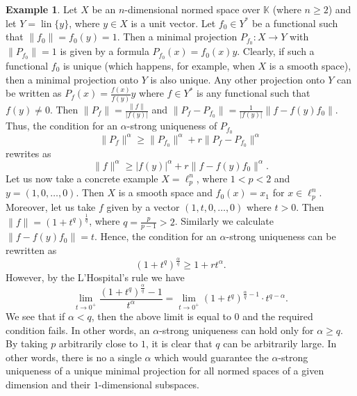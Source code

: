 \documentclass[12pt, reqno]{amsart}
\theoremstyle{definition}
\newtheorem{example}[twr]{Example}
\theoremstyle{remark}
\numberwithin{equation}{section}
\DeclareMathOperator{\lin}{lin}
\begin{document}
\begin{example}
\label{example1dim}
Let $X$ be an $n$-dimensional normed space over $\mathbb{K}$ (where $n \geq 2$) and let $Y = \lin\{y\}$, where $y \in X$ is a unit vector. Let $f_0 \in Y^*$ be a functional such that $\|f_0\|=f_0(y)=1$. Then a minimal projection $P_{f_0}: X \to Y$ with $\|P_{f_0}\|=1$ is given by a formula $P_{f_0}(x)= f_0(x)y$. Clearly, if such a functional $f_0$ is unique (which happens, for example, when $X$ is a smooth space), then a minimal projection onto $Y$ is also unique. Any other projection onto $Y$ can be written as $P_{f}(x)=\frac{f(x)}{f(y)} y$ where $f \in Y^*$ is any functional such that $f(y) \neq 0$. Then $\|P_f\| = \frac{\|f\|}{|f(y)|}$ and $\|P_f - P_{f_0}\| = \frac{1}{|f(y)|}\|f - f(y)f_0\|$. Thus, the condition for an $\alpha$-strong uniqueness of $P_{f_0}$
$$\|P_{f}\|^{\alpha} \geq \|P_{f_0}\|^{\alpha} + r \|P_f - P_{f_0}\|^{\alpha}$$
rewrites as
$$\|f\|^{\alpha} \geq |f(y)|^{\alpha} + r\|f - f(y)f_0\|^{\alpha}.$$
Let us now take a concrete example $X = \ell_p^n$, where $1 < p < 2$ and $y=(1, 0, \ldots, 0)$. Then $X$ is a smooth space and $f_0(x)=x_1$ for $x \in \ell_p^n$. Moreover, let us take $f$ given by a vector $(1, t, 0, \ldots, 0)$ where $t>0$. Then $\|f\|=\left ( 1 + t^q \right )^{\frac{1}{q}}$, where $q = \frac{p}{p-1}>2$. Similarly we calculate $\|f-f(y)f_0\| = t$. Hence, the condition for an $\alpha$-strong uniqueness can be rewritten as
$$\left ( 1 + t^q \right )^{\frac{\alpha}{q}} \geq 1 + rt^{\alpha}.$$
However, by the L'Hospital's rule we have
$$\lim_{t \to 0^+} \frac{\left ( 1 + t^q \right )^{\frac{\alpha}{q}} - 1}{t^{\alpha}} = \lim_{t \to 0^+} \left ( 1 + t^q \right )^{\frac{\alpha}{q}-1} \cdot t^{q-\alpha}.$$
We see that if $\alpha<q$, then the above limit is equal to $0$ and the required condition fails. In other words, an $\alpha$-strong uniqueness can hold only for $\alpha \geq q$. By taking $p$ arbitrarily close to $1$, it is clear that $q$ can be arbitrarily large. In other words, there is no a single $\alpha$ which would guarantee the $\alpha$-strong uniqueness of a unique minimal projection for all normed spaces of a given dimension and their $1$-dimensional subspaces.
\end{example}
\end{document}
